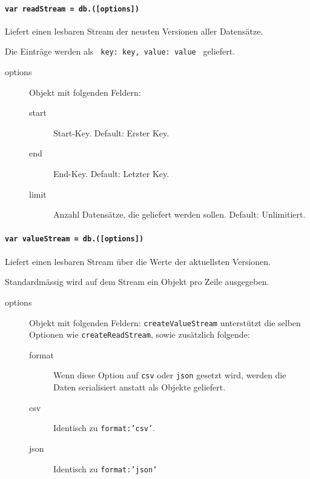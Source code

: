 
\paragraph{\texttt{var readStream = db.([options])}}
Liefert einen lesbaren Stream der neusten Versionen aller Datensätze.

Die Einträge werden als \texttt{ {key: key, value: value} } geliefert.

\begin{description}
\item[options] Objekt mit folgenden Feldern:
    \begin{description}
    \item[start] Start-Key. Default: Erster Key.
    \item[end] End-Key. Default: Letzter Key.
    \item[limit] Anzahl Datensätze, die geliefert werden sollen. Default: Unlimitiert.
    \end{description}
\end{description}


\paragraph{\texttt{var valueStream = db.([options])}}
Liefert einen lesbaren Stream über die Werte der aktuellsten Versionen.

Standardmässig wird auf dem Stream ein Objekt pro Zeile ausgegeben.

\begin{description}
\item[options] Objekt mit folgenden Feldern:
    \texttt{createValueStream} unterstützt die selben Optionen wie \texttt{createReadStream}, sowie zusätzlich folgende:
    \begin{description}
    \item[format] Wenn diese Option auf \texttt{csv} oder \texttt{json} gesetzt wird, werden die Daten serialisiert anstatt als Objekte geliefert.
    \item[csv] Identisch zu \texttt{format:'csv'}.
    \item[json] Identisch zu \texttt{format:'json'}
    \end{description}
\end{description}

